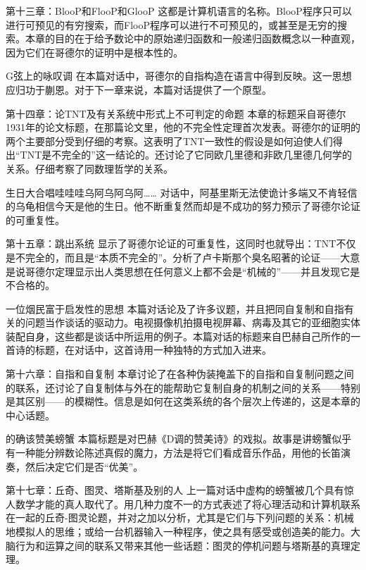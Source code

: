 \begin{overview}
\item[第十三章：BlooP和FlooP和GlooP]这都是计算机语言的名称。BlooP程序只可以进行可预见的有穷搜索，而FlooP程序可以进行不可预见的，或甚至是无穷的搜索。本章的目的在于给予数论中的原始递归函数和一般递归函数概念以一种直观，因为它们在哥德尔的证明中是根本性的。

\item[G弦上的咏叹调]在本篇对话中，哥德尔的自指构造在语言中得到反映。这一思想应归功于蒯恩。对于下一章来说，本篇对话提供了一个原型。

\item[第十四章：论TNT及有关系统中形式上不可判定的命题]本章的标题采自哥德尔1931年的论文标题，在那篇论文里，他的不完全性定理首次发表。哥德尔的证明的两个主要部分受到仔细的考察。这表明了TNT一致性的假设是如何迫使人们得出“TNT是不完全的”这一结论的。还讨论了它同欧几里德和非欧几里德几何学的关系。仔细考察了同数理哲学的关系。

\item[生日大合唱哇哇哇乌阿乌阿乌阿……]对话中，阿基里斯无法使诡计多端又不肯轻信的乌龟相信今天是他的生日。他不断重复然而却是不成功的努力预示了哥德尔论证的可重复性。

\item[第十五章：跳出系统]显示了哥德尔论证的可重复性，这同时也就导出：TNT不仅是不完全的，而且是“本质不完全的”。分析了卢卡斯那个臭名昭著的论证——大意是说哥德尔定理显示出人类思想在任何意义上都不会是“机械的”——并且发现它是不合格的。

\item[一位烟民富于启发性的思想]本篇对话论及了许多议题，并且把同自复制和自指有关的问题当作谈话的驱动力。电视摄像机拍摄电视屏幕、病毒及其它的亚细胞实体装配自身，这些都是谈话中所运用的例子。本篇对话的标题来自巴赫自己所作的一首诗的标题，在对话中，这首诗用一种独特的方式加入进来。

\item[第十六章：自指和自复制]本章讨论了在各种伪装掩盖下的自指和自复制问题之间的联系，还讨论了自复制体与外在的能帮助它复制自身的机制之间的关系——特别是其区别——的模糊性。信息是如何在这类系统的各个层次上传递的，这是本章的中心话题。

\item[的确该赞美螃蟹]本篇标题是对巴赫《D调的赞美诗》的戏拟。故事是讲螃蟹似乎有一种能分辨数论陈述真假的魔力，方法是将它们看成音乐作品，用他的长笛演奏，然后决定它们是否“优美”。

\item[第十七章：丘奇、图灵、塔斯基及别的人]上一篇对话中虚构的螃蟹被几个具有惊人数学才能的真人取代了。用几种力度不一的方式表述了将心理活动和计算机联系在一起的丘奇-图灵论题，并对之加以分析，尤其是它们与下列问题的关系：机械地模拟人的思维；或给一台机器输入一种程序，使之具有感受或创造美的能力。大脑行为和运算之间的联系又带来其他一些话题：图灵的停机问题与塔斯基的真理定理。


\end{overview}
